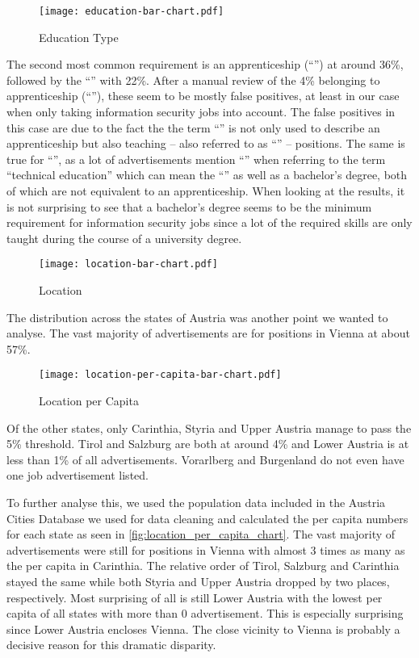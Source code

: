 \documentclass[runningheads]{llncs}
\begin{document}
\begin{figure}[H]
	\centering
  \texttt{[image: education-bar-chart.pdf]}
	\caption{Education Type}
	\label{fig:education_chart}
\end{figure}

The second most common requirement is an apprenticeship (“”) at around 36\%, followed by the “” with 22\%. After a manual review of the 4\% belonging to apprenticeship (“”), these seem to be mostly false positives, at least in our case when only taking information security jobs into account. The false positives in this case are due to the fact the the term “” is not only used to describe an apprenticeship but also teaching -- also referred to as “” -- positions. The same is true for “”, as a lot of advertisements mention “” when referring to the term “technical education” which can mean the “” as well as a bachelor's degree, both of which are not equivalent to an apprenticeship. When looking at the results, it is not surprising to see that a bachelor's degree seems to be the minimum requirement for information security jobs since a lot of the required skills are only taught during the course of a university degree.

\begin{figure}[H]
	\centering
  \texttt{[image: location-bar-chart.pdf]}
	\caption{Location}
	\label{fig:location_chart}
\end{figure}

The distribution across the states of Austria was another point we wanted to analyse. The vast majority of advertisements are for positions in Vienna at about 57\%.

\begin{figure}[H]
	\centering
  \texttt{[image: location-per-capita-bar-chart.pdf]}
	\caption{Location per Capita}
	\label{fig:location_per_capita_chart}
\end{figure}

Of the other states, only Carinthia, Styria and Upper Austria manage to pass the 5\% threshold. Tirol and Salzburg are both at around 4\% and Lower Austria is at less than 1\% of all advertisements. Vorarlberg and Burgenland do not even have one job advertisement listed.

To further analyse this, we used the population data included in the Austria Cities Database \cite{austria_cities_database} we used for data cleaning and calculated the per capita numbers for each state as seen in \autoref{fig:location_per_capita_chart}. The vast majority of advertisements were still for positions in Vienna with almost 3 times as many as the per capita in Carinthia. The relative order of Tirol, Salzburg and Carinthia stayed the same while both Styria and Upper Austria dropped by two places, respectively. Most surprising of all is still Lower Austria with the lowest per capita of all states with more than 0 advertisement. This is especially surprising since Lower Austria encloses Vienna. The close vicinity to Vienna is probably a decisive reason for this dramatic disparity.
\end{document}
